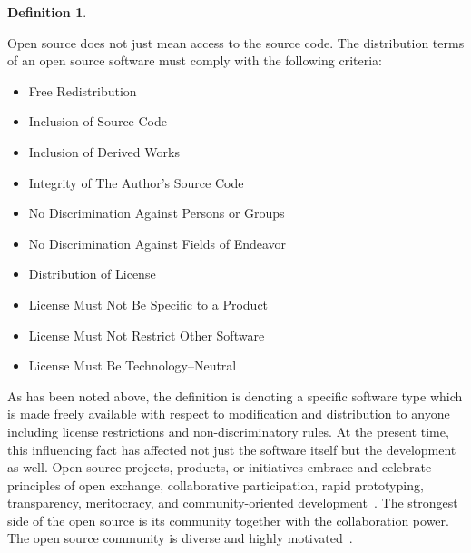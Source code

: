 \documentclass[12pt,a4paper]{article}
\theoremstyle{definition}
\newtheorem{definition}{Definition}[section]
\begin{document}
    \begin{definition}
        \cite{BOOK:open-source-def, WP:opensource-osd, WP:opensource-debian}\\[-5mm]
        \begin{center}
            \begin{minipage}{0.9\textwidth}
                Open source does not just mean access to the source code. The distribution terms of an open source software must comply with the following criteria:\\[-7mm]
                \begin{itemize}
                    \item Free Redistribution\\[-7mm]
                    \item Inclusion of Source Code\\[-7mm]
                    \item Inclusion of Derived Works\\[-7mm]
                    \item Integrity of The Author's Source Code\\[-7mm]
                    \item No Discrimination Against Persons or Groups\\[-7mm]
                    \item No Discrimination Against Fields of Endeavor\\[-7mm]
                    \item Distribution of License\\[-7mm]
                    \item License Must Not Be Specific to a Product\\[-7mm]
                    \item License Must Not Restrict Other Software\\[-7mm]
                    \item License Must Be Technology--Neutral\\
                \end{itemize}
            \end{minipage}
        \end{center}
    \end{definition}

    As has been noted above, the definition is denoting a specific software type which is made freely available with respect to modification and distribution to anyone including license restrictions and non-discriminatory rules. At the present time, this influencing fact has affected not just the software itself but the development as well. Open source projects, products, or initiatives embrace and celebrate principles of open exchange, collaborative participation, rapid prototyping, transparency, meritocracy, and community-oriented development~\cite{WP:what-is-os}. The strongest side of the open source is its community together with the collaboration power. The open source community is diverse and highly motivated~\cite{WP:opensource-com}.\\
\end{document}
